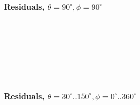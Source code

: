 \documentclass[svgnames] {beamer}
\begin{document}
\begin{frame}
	\frametitle{Residuals, $\theta = 90^{\circ}, \phi = 90^{\circ}$}
	\begin{figure}[H]
		\centering
		\begin{minipage}[h]{0.45\linewidth}
			\\	
		\end{minipage}
		\begin{minipage}[h]{0.45\linewidth}
			\\
		\end{minipage}
		\vfill
		\begin{minipage}[h]{0.45\linewidth}
			\\
		\end{minipage}
		\begin{minipage}[h]{0.45\linewidth}
			\\
		\end{minipage}
	\end{figure}
\end{frame}

\begin{frame}
	\frametitle{Residuals, $\theta = 30^{\circ}..150^{\circ}, \phi = 0^{\circ}..360^{\circ}$}
	\begin{figure}[H]
		\centering
		\begin{minipage}[h]{0.44\linewidth}
			\\	
		\end{minipage}
		\begin{minipage}[h]{0.46\linewidth}
			\\
		\end{minipage}
		\vfill
		\begin{minipage}[h]{0.435\linewidth}
			\\
		\end{minipage}
		\begin{minipage}[h]{0.465\linewidth}
			\\
		\end{minipage}
	\end{figure}
\end{frame}
\end{document}

